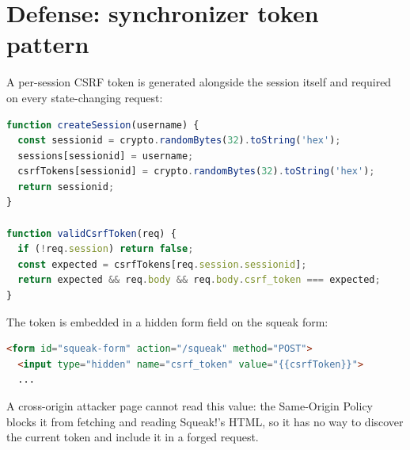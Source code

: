 \documentclass[11pt]{article}
\begin{document}
\section{Defense: synchronizer token pattern}
A per-session CSRF token is generated alongside the session itself and
required on every state-changing request:
\begin{lstlisting}[language=JavaScript]
function createSession(username) {
  const sessionid = crypto.randomBytes(32).toString('hex');
  sessions[sessionid] = username;
  csrfTokens[sessionid] = crypto.randomBytes(32).toString('hex');
  return sessionid;
}

function validCsrfToken(req) {
  if (!req.session) return false;
  const expected = csrfTokens[req.session.sessionid];
  return expected && req.body && req.body.csrf_token === expected;
}
\end{lstlisting}
The token is embedded in a hidden form field on the squeak form:
\begin{lstlisting}[language=HTML]
<form id="squeak-form" action="/squeak" method="POST">
  <input type="hidden" name="csrf_token" value="{{csrfToken}}">
  ...
\end{lstlisting}
A cross-origin attacker page cannot read this value: the Same-Origin Policy
blocks it from fetching and reading Squeak!'s HTML, so it has no way to
discover the current token and include it in a forged request.
\end{document}

